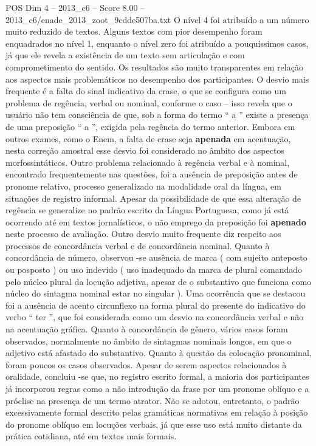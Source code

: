 \begin{textsample}{POS Dim 4 – 2013\_c6 – Score 8.00 – 2013\_c6/enade\_2013\_zoot\_9cdde507ba.txt}
O nível 4 foi atribuído a um número muito reduzido de textos.
Alguns textos com pior desempenho foram enquadrados no nível 1, enquanto o nível zero foi atribuído a pouquíssimos casos, já que ele revela a existência de um texto sem articulação e com comprometimento do sentido.
Os resultados são muito transparentes em relação aos aspectos mais problemáticos no desempenho dos participantes.
O desvio mais frequente é a falta do sinal indicativo da crase, o que se configura como um problema de regência, verbal ou nominal, conforme o caso – isso revela que o usuário não tem consciência de que, sob a forma do termo “ a ” existe a presença de uma preposição “ a ”, exigida pela regência do termo anterior.
Embora em outros exames, como o Enem, a falta de crase seja \textbf{apenada} em acentuação, nesta correção amostral esse desvio foi considerado no âmbito dos aspectos morfossintáticos.
Outro problema relacionado à regência verbal e à nominal, encontrado frequentemente nas questões, foi a ausência de preposição antes de pronome relativo, processo generalizado na modalidade oral da língua, em situações de registro informal.
Apesar da possibilidade de que essa alteração de regência se generalize no padrão escrito da Língua Portuguesa, como já está ocorrendo até em textos jornalísticos, o não emprego da preposição foi \textbf{apenado} neste processo de avaliação.
Outro desvio muito frequente diz respeito aos processos de concordância verbal e de concordância nominal.
Quanto à concordância de número, observou -se ausência de marca ( com sujeito anteposto ou posposto ) ou uso indevido ( uso inadequado da marca de plural comandado pelo núcleo plural da locução adjetiva, apesar de o substantivo que funciona como núcleo do sintagma nominal estar no singular ).
Uma ocorrência que se destacou foi a ausência de acento circunflexo na forma plural do presente do indicativo do verbo “ ter ”, que foi considerada como um desvio na concordância verbal e não na acentuação gráfica.
Quanto à concordância de gênero, vários casos foram observados, normalmente no âmbito de sintagmas nominais longos, em que o adjetivo está afastado do substantivo.
Quanto à questão da colocação pronominal, foram poucos os casos observados.
Apesar de serem aspectos relacionados à oralidade, concluiu -se que, no registro escrito formal, a maioria dos participantes já incorporou regras como a não introdução da frase por um pronome oblíquo e a próclise na presença de um termo atrator.
Não se adotou, entretanto, o padrão excessivamente formal descrito pelas gramáticas normativas em relação à posição do pronome oblíquo em locuções verbais, já que esse uso está muito distante da prática cotidiana, até em textos mais formais.

\end{textsample}
